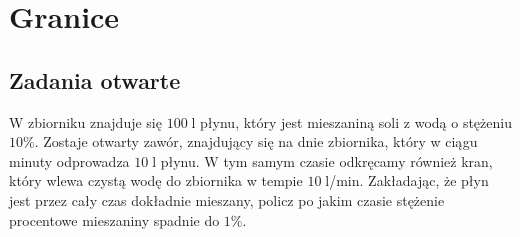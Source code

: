 \setcounter{parc}{0}
\addtocounter{chapc}{1}

\chapter{Granice}

\section{Zadania otwarte}

\zadanie W zbiorniku znajduje się $100\;$l płynu, który jest mieszaniną soli z wodą o stężeniu $10\%$. Zostaje otwarty zawór, znajdujący się na dnie zbiornika, który w ciągu minuty odprowadza $10\;$l płynu. W tym samym czasie odkręcamy również kran, który wlewa czystą wodę do zbiornika w tempie {$10\;$l/min.} Zakładając, że płyn jest przez cały czas dokładnie mieszany, policz po jakim czasie stężenie procentowe mieszaniny spadnie do $1\%$. %